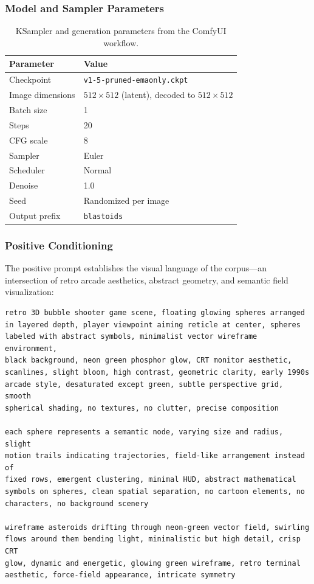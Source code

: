 \documentclass[12pt, a4paper]{article}
\theoremstyle{definition}
\begin{document}
\subsubsection{Model and Sampler Parameters}

\begin{table}[H]
\centering
\begin{tabular}{>{\ttfamily}ll}
\toprule
\textbf{Parameter} & \textbf{Value} \\
\midrule
Checkpoint & \texttt{v1-5-pruned-emaonly.ckpt} \\
Image dimensions & $512 \times 512$ (latent), decoded to $512 \times 512$ \\
Batch size & 1 \\
Steps & 20 \\
CFG scale & 8 \\
Sampler & Euler \\
Scheduler & Normal \\
Denoise & 1.0 \\
Seed & Randomized per image \\
Output prefix & \texttt{blastoids} \\
\bottomrule
\end{tabular}
\caption{KSampler and generation parameters from the ComfyUI workflow.}
\end{table}

\subsubsection{Positive Conditioning}

The positive prompt establishes the visual language of the corpus---an intersection of retro arcade aesthetics, abstract geometry, and semantic field visualization:

\begin{lstlisting}[language={},caption={Positive CLIPTextEncode prompt (node id:6)}]
retro 3D bubble shooter game scene, floating glowing spheres arranged 
in layered depth, player viewpoint aiming reticle at center, spheres 
labeled with abstract symbols, minimalist vector wireframe environment, 
black background, neon green phosphor glow, CRT monitor aesthetic, 
scanlines, slight bloom, high contrast, geometric clarity, early 1990s 
arcade style, desaturated except green, subtle perspective grid, smooth 
spherical shading, no textures, no clutter, precise composition

each sphere represents a semantic node, varying size and radius, slight 
motion trails indicating trajectories, field-like arrangement instead of 
fixed rows, emergent clustering, minimal HUD, abstract mathematical 
symbols on spheres, clean spatial separation, no cartoon elements, no 
characters, no background scenery

wireframe asteroids drifting through neon-green vector field, swirling 
flows around them bending light, minimalistic but high detail, crisp CRT 
glow, dynamic and energetic, glowing green wireframe, retro terminal 
aesthetic, force-field appearance, intricate symmetry
\end{lstlisting}
\end{document}
